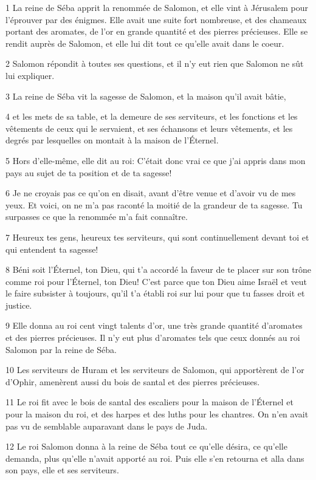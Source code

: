 \par 1 La reine de Séba apprit la renommée de Salomon, et elle vint à Jérusalem pour l'éprouver par des énigmes. Elle avait une suite fort nombreuse, et des chameaux portant des aromates, de l'or en grande quantité et des pierres précieuses. Elle se rendit auprès de Salomon, et elle lui dit tout ce qu'elle avait dans le coeur.
\par 2 Salomon répondit à toutes ses questions, et il n'y eut rien que Salomon ne sût lui expliquer.
\par 3 La reine de Séba vit la sagesse de Salomon, et la maison qu'il avait bâtie,
\par 4 et les mets de sa table, et la demeure de ses serviteurs, et les fonctions et les vêtements de ceux qui le servaient, et ses échansons et leurs vêtements, et les degrés par lesquelles on montait à la maison de l'Éternel.
\par 5 Hors d'elle-même, elle dit au roi: C'était donc vrai ce que j'ai appris dans mon pays au sujet de ta position et de ta sagesse!
\par 6 Je ne croyais pas ce qu'on en disait, avant d'être venue et d'avoir vu de mes yeux. Et voici, on ne m'a pas raconté la moitié de la grandeur de ta sagesse. Tu surpasses ce que la renommée m'a fait connaître.
\par 7 Heureux tes gens, heureux tes serviteurs, qui sont continuellement devant toi et qui entendent ta sagesse!
\par 8 Béni soit l'Éternel, ton Dieu, qui t'a accordé la faveur de te placer sur son trône comme roi pour l'Éternel, ton Dieu! C'est parce que ton Dieu aime Israël et veut le faire subsister à toujours, qu'il t'a établi roi sur lui pour que tu fasses droit et justice.
\par 9 Elle donna au roi cent vingt talents d'or, une très grande quantité d'aromates et des pierres précieuses. Il n'y eut plus d'aromates tels que ceux donnés au roi Salomon par la reine de Séba.
\par 10 Les serviteurs de Huram et les serviteurs de Salomon, qui apportèrent de l'or d'Ophir, amenèrent aussi du bois de santal et des pierres précieuses.
\par 11 Le roi fit avec le bois de santal des escaliers pour la maison de l'Éternel et pour la maison du roi, et des harpes et des luths pour les chantres. On n'en avait pas vu de semblable auparavant dans le pays de Juda.
\par 12 Le roi Salomon donna à la reine de Séba tout ce qu'elle désira, ce qu'elle demanda, plus qu'elle n'avait apporté au roi. Puis elle s'en retourna et alla dans son pays, elle et ses serviteurs.
